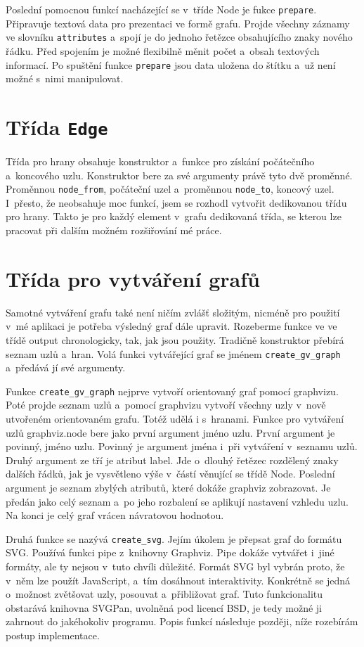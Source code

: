 \documentclass[color,table,oneside,nolot,nolof]{fithesis}
\begin{document}
	Poslední pomocnou funkcí nacházející se v~tříde Node je fukce \texttt{prepare}. Připravuje textová data pro prezentaci ve formě grafu. Projde všechny záznamy ve slovníku \texttt{attributes} a~spojí je do 
	jednoho řetězce obsahujícího znaky nového řádku. Před spojením je možné flexibilně měnit počet a~obsah textových informací. Po spuštění funkce \texttt{prepare} jsou data uložena do štítku a~už není možné
	s~nimi manipulovat.

\section{Třída \texttt{Edge}}
	Třída pro hrany obsahuje konstruktor a~funkce pro získání počátečního a~koncového uzlu. Konstruktor bere za své argumenty právě tyto dvě 
	proměnné. Proměnnou \texttt{node\_from}, počáteční uzel a~proměnnou \texttt{node\_to}, koncový uzel. I~přesto, že neobsahuje moc funkcí, jsem se rozhodl vytvořit dedikovanou třídu pro hrany. 
	Takto je pro každý element v~grafu dedikovaná třída, se kterou lze pracovat při dalším možném rozšiřování mé práce.

\section{Třída pro vytváření grafů}
	Samotné vytváření grafu také není ničím zvlášť složitým, nicméně pro použití v~mé aplikaci je potřeba výsledný graf dále upravit. Rozeberme funkce ve ve třídě output chronologicky,
	tak, jak jsou použity. Tradičně konstruktor přebírá seznam uzlů a~hran. Volá funkci vytvářející graf se jménem \texttt{create\_gv\_graph} a~předává jí své argumenty. 

	Funkce \texttt{create\_gv\_graph} nejprve vytvoří orientovaný graf pomocí graphvizu. Poté projde seznam uzlů a~pomocí graphvizu vytvoří všechny uzly v~nově utvořeném orientovaném grafu. Totéž udělá i
	s~hranami. Funkce pro vytváření uzlů graphviz.node bere jako první argument jméno uzlu. První argument je povinný, jméno uzlu. Povinný je argument jména
	i~při vytváření v~seznamu uzlů. Druhý argument ze tří je atribut label. Jde o~dlouhý řetězec rozdělený znaky dalších řádků, jak je vysvětleno výše v~částí věnující se třídě Node.
	Poslední argument je seznam zbylých atributů, které dokáže graphviz zobrazovat. Je předán jako celý seznam a~po jeho rozbalení se aplikují nastavení vzhledu uzlu. Na konci je celý
	graf vrácen návratovou hodnotou.

	Druhá funkce se nazývá \texttt{create\_svg}. Jejím úkolem je přepsat graf do formátu SVG. Používá funkci pipe z~knihovny Graphviz. Pipe dokáže vytvářet i~jiné formáty, ale ty nejsou v~tuto
	chvíli důležité. Formát SVG byl vybrán proto, že v~něm lze použít JavaScript, a~tím dosáhnout interaktivity. Konkrétně se jedná o~možnost zvětšovat uzly, posouvat a~přibližovat graf.
	Tuto funkcionalitu obstarává knihovna SVGPan\cite{svgpan}, uvolněná pod licencí BSD, je tedy možné ji zahrnout do jakéhokoliv programu.
	Popis funkcí následuje později, níže rozebírám postup implementace.
\end{document}
